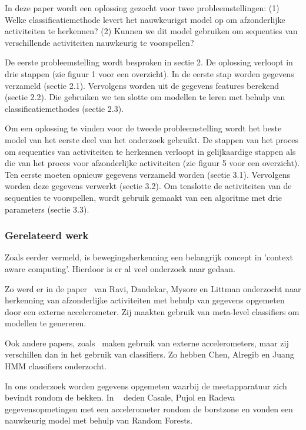 \documentclass{article}
\begin{document}
In deze paper wordt een oplossing gezocht voor twee probleemstellingen: (1) Welke classificatiemethode levert het nauwkeurigst model op om afzonderlijke activiteiten te herkennen? (2) Kunnen we dit model gebruiken om sequenties van verschillende activiteiten nauwkeurig te voorspellen?

De eerste probleemstelling wordt besproken in sectie 2. De oplossing verloopt in drie stappen (zie figuur 1 voor een overzicht). In de eerste stap worden gegevens verzameld (sectie 2.1). Vervolgens worden uit de gegevens features berekend (sectie 2.2). Die gebruiken we ten slotte om modellen te leren met behulp van classificatiemethodes (sectie 2.3).

Om een oplossing te vinden voor de tweede probleemstelling wordt het beste model van het eerste deel van het onderzoek gebruikt. De stappen van het proces om sequenties van activiteiten te herkennen verloopt in gelijkaardige stappen als die van het proces voor afzonderlijke activiteiten (zie figuur 5 voor een overzicht). Ten eerste moeten opnieuw gegevens verzameld worden (sectie 3.1). Vervolgens worden deze gegevens verwerkt (sectie 3.2). Om tenslotte de activiteiten van de sequenties te voorspellen, wordt gebruik gemaakt van een algoritme met drie parameters (sectie 3.3).

\subsubsection{Gerelateerd werk}

Zoals eerder vermeld, is bewegingsherkenning een belangrijk concept in 'context aware computing'. Hierdoor is er al veel onderzoek naar gedaan.

Zo werd er in de paper~\cite{Ravi and others:act.recogn.} van Ravi, Dandekar, Mysore en Littman onderzocht naar herkenning van afzonderlijke activiteiten met behulp van gegevens opgemeten door een externe accelerometer. Zij maakten gebruik van meta-level classifiers om modellen te genereren.

Ook andere papers, zoals~\cite{6dmotion} maken gebruik van externe accelerometers, maar zij verschillen dan in het gebruik van classifiers. Zo hebben Chen, Alregib en Juang HMM classifiers onderzocht.

In ons onderzoek worden gegevens opgemeten waarbij de meetapparatuur zich bevindt rondom de bekken. In ~\cite{act.rec.} deden Casale, Pujol en Radeva gegevensopmetingen met een accelerometer rondom de borstzone en vonden een nauwkeurig model met behulp van Random Forests.
\end{document}
